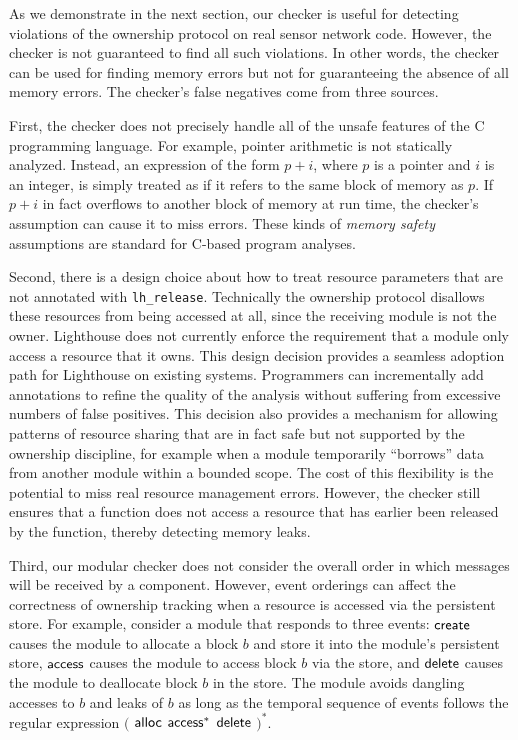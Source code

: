 As we demonstrate in the next section, our checker is useful for
detecting violations of the ownership protocol on real sensor network
code.  However, the checker is not guaranteed to find all such
violations.  In other words, the checker can be used for finding
memory errors but not for guaranteeing the absence of all memory
errors.  The checker's false negatives come from three sources.

First, the checker does not precisely handle all of the unsafe
features of the C programming language.  For example, pointer
arithmetic is not statically analyzed.  Instead, an expression of the
form $p+i$, where $p$ is a pointer and $i$ is an integer, is simply
treated as if it refers to the same block of memory as $p$.  If $p+i$
in fact overflows to another block of memory at run time, the
checker's assumption can cause it to miss errors.  These kinds of
{\em memory safety} assumptions are standard for C-based program analyses.

Second, there is a design choice about how to treat resource
parameters that are not
annotated with {\tt lh\_release}.  Technically the
ownership protocol disallows these resources from being accessed at
all, since the receiving module is not the owner.  
%
Lighthouse does not currently enforce the requirement that a module
only access a resource that it owns.
% 
This design decision provides a seamless adoption path for Lighthouse
on existing systems.  Programmers can incrementally add
annotations to refine the quality of the analysis without
suffering from excessive numbers of false positives.
%
This decision also provides a mechanism for allowing patterns of resource
sharing that are in fact safe but not supported by the ownership
discipline, for example when a module temporarily ``borrows'' data from
another module within a bounded scope.
%
The cost of this flexibility is the potential to miss real resource
management errors.
%
However, the checker still ensures that a function does not access a
resource that has earlier been released by the function, thereby
detecting memory leaks.

Third, our modular checker does not consider the overall order in
which messages will be received by a component.  
%
However, event orderings
can affect the correctness of ownership tracking when a resource is
accessed via the persistent store.
%
For example, consider a module that responds to three events: ${\mathsf{create}}$
causes the module to allocate a block $b$ and store it into the
module's persistent store, ${\mathsf{access}}$ causes the module to access block
$b$ via the store, and ${\mathsf{delete}}$ causes the module to deallocate
block $b$ in the store.  
%
The module avoids dangling accesses to $b$ and leaks of $b$ 
as long as the temporal sequence
of events follows the regular expression $($ ${\mathsf{alloc}}$ ${\mathsf{access}}^*$
${\mathsf{delete}}$ $)^*$.  
%
%

